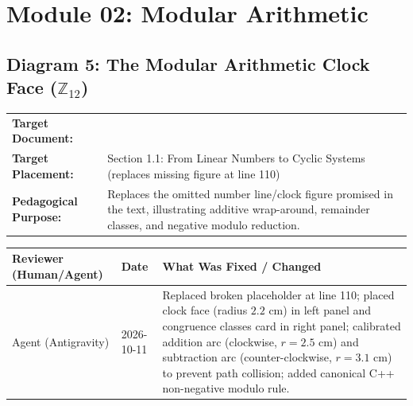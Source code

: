 \documentclass[11pt,a4paper]{article}
\newcommand{\breadcrumb}[3]{
    \par\vspace{0.15cm}
    \noindent\begin{tabularx}{\textwidth}{|l|X|}
    \hline
    \textbf{Target Document:} & \texttt{\detokenize{#1}} \\
    \textbf{Target Placement:} & #2 \\
    \textbf{Pedagogical Purpose:} & #3 \\
    \hline
    \end{tabularx}
    \vspace{0.15cm}\par
}
\newcommand{\diagramaudit}[3]{
    \par\vspace{0.12cm}
    \noindent\begin{tabularx}{\textwidth}{|l|l|>{\raggedright\arraybackslash}X|}
    \hline
    \textbf{Reviewer (Human/Agent)} & \textbf{Date} & \textbf{What Was Fixed / Changed} \\ \hline
    #1 & #2 & #3 \\ \hline
    \end{tabularx}
    \vspace{0.12cm}\par
}
\begin{document}
\newpage
\section{Module 02: Modular Arithmetic}

\subsection{Diagram 5: The Modular Arithmetic Clock Face (\texorpdfstring{$\mathbb{Z}_{12}$}{Z12})}

\breadcrumb{02.modular_arithmetic.tex}{Section 1.1: From Linear Numbers to Cyclic Systems (replaces missing figure at line 110)}{Replaces the omitted number line/clock figure promised in the text, illustrating additive wrap-around, remainder classes, and negative modulo reduction.}

\diagramaudit{Agent (Antigravity)}{2026-10-11}{Replaced broken placeholder at line 110; placed clock face (radius $2.2\text{ cm}$) in left panel and congruence classes card in right panel; calibrated addition arc (clockwise, $r=2.5\text{ cm}$) and subtraction arc (counter-clockwise, $r=3.1\text{ cm}$) to prevent path collision; added canonical C++ non-negative modulo rule.}
\end{document}
